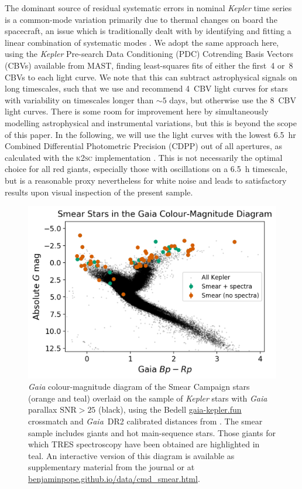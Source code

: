 \documentclass[a4paper,fleqn,usenatbib]{mnras}
\newcommand{\kepler}{\emph{Kepler}\xspace}
\newcommand{\gaia}{\emph{Gaia}\xspace}
\begin{document}
The dominant source of residual systematic errors in nominal \kepler time series is a common-mode variation primarily due to thermal changes on board the spacecraft, an issue which is traditionally dealt with by identifying and fitting a linear combination of systematic modes \citep{pdc0,pdc1,pdc2,petigura}. We adopt the same approach here, using the \kepler Pre-search Data Conditioning (PDC) Cotrending Basis Vectors (CBVs) available from MAST, finding least-squares fits of  either the first~4 or~8 CBVs to each light curve. We note that this can subtract astrophysical signals on long timescales, such that we use and recommend 4~CBV light curves for stars with variability on timescales longer than $\sim 5$ days, but otherwise use the 8~CBV light curves. There is some room for improvement here by simultaneously modelling astrophysical and instrumental variations, but this is beyond the scope of this paper. In the following, we will use the light curves with the lowest 6.5~hr Combined Differential Photometric Precision (CDPP) \citep{cdpp} out of all apertures, as calculated with the \textsc{k2sc} implementation \citep{k2sc}. This is not necessarily the optimal choice for all red giants, especially those with oscillations on a 6.5~h timescale, but is a reasonable proxy nevertheless for white noise and leads to satisfactory results upon visual inspection of the present sample.


\begin{figure}
\noindent\includegraphics[width=15cm,keepaspectratio]{gaia_kepler_hr.png}

\caption{\label{hrdiagram}
\gaia colour-magnitude diagram of the Smear Campaign stars (orange and teal) overlaid on the sample of \kepler stars with \gaia parallax $\text{SNR} > 25$ (black), using the Bedell \url{gaia-kepler.fun} crossmatch and \gaia~DR2 calibrated distances from \citet{gaiadists}. The smear sample includes giants and hot main-sequence stars. Those giants for which TRES spectroscopy have been obtained are highlighted in teal. An interactive version of this diagram is available as supplementary material from the journal or at \url{benjaminpope.github.io/data/cmd_smear.html}.}
\end{figure}
\end{document}
